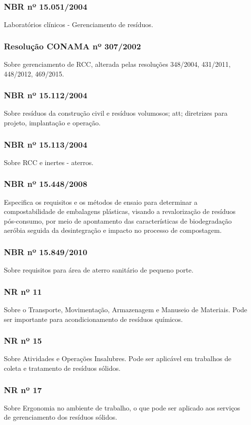 \begin{subapend}
\begin{subsubapend}
		\subsubsection{NBR nº 15.051/2004}
		Laboratórios clínicos - Gerenciamento de resíduos.
		\subsubsection{Resolução CONAMA nº 307/2002}
		Sobre gerenciamento de RCC, alterada pelas resoluções 348/2004, 431/2011, 448/2012, 469/2015.
		\subsubsection{NBR nº 15.112/2004}
		Sobre resíduos da construção civil e resíduos volumosos; \gls{att}; diretrizes para projeto, implantação e operação.
		\subsubsection{NBR nº 15.113/2004}
		Sobre RCC e inertes - aterros.
		\subsubsection{NBR nº 15.448/2008}
		Especifica os requisitos e os métodos de ensaio para determinar a compostabilidade de embalagens plásticas, visando a revalorização de resíduos pós-consumo, por meio de apontamento das características de biodegradação aeróbia seguida da desintegração e impacto no processo de compostagem.
		\subsubsection{NBR nº 15.849/2010}
		Sobre requisitos para área de aterro sanitário de pequeno porte. 
		\subsubsection{NR nº 11}
		Sobre o Transporte, Movimentação, Armazenagem e Manuseio de Materiais. Pode ser importante para acondicionamento de resíduos químicos.
		\subsubsection{NR nº 15}
		Sobre Atividades e Operações Insalubres. Pode ser aplicável em trabalhos de coleta e tratamento de resíduos sólidos.
		\subsubsection{NR nº 17}
		Sobre Ergonomia no ambiente de trabalho, o que pode ser aplicado aos serviços de gerenciamento dos resíduos sólidos.
	\end{subsubapend}
\end{subapend}

